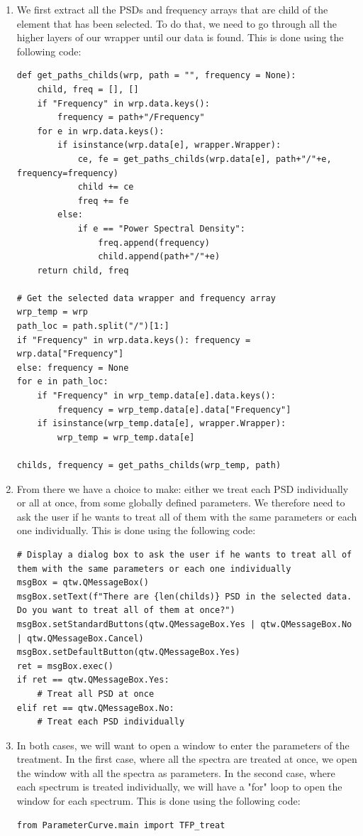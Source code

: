 \documentclass[a4paper,12pt]{article}
\begin{document}
        \begin{enumerate}
            \item We first extract all the PSDs and frequency arrays that are child of the element that has been selected. To do that, we need to go through all the higher layers of our wrapper until our data is found. This is done using the following code:
\begin{lstlisting}
def get_paths_childs(wrp, path = "", frequency = None):
    child, freq = [], []
    if "Frequency" in wrp.data.keys():
        frequency = path+"/Frequency"
    for e in wrp.data.keys():
        if isinstance(wrp.data[e], wrapper.Wrapper):
            ce, fe = get_paths_childs(wrp.data[e], path+"/"+e, frequency=frequency)
            child += ce
            freq += fe
        else:
            if e == "Power Spectral Density":
                freq.append(frequency)
                child.append(path+"/"+e)
    return child, freq
        
# Get the selected data wrapper and frequency array
wrp_temp = wrp
path_loc = path.split("/")[1:]
if "Frequency" in wrp.data.keys(): frequency = wrp.data["Frequency"]
else: frequency = None
for e in path_loc: 
    if "Frequency" in wrp_temp.data[e].data.keys(): 
        frequency = wrp_temp.data[e].data["Frequency"]
    if isinstance(wrp_temp.data[e], wrapper.Wrapper): 
        wrp_temp = wrp_temp.data[e]

childs, frequency = get_paths_childs(wrp_temp, path)
\end{lstlisting}
        \item From there we have a choice to make: either we treat each PSD individually or all at once, from some globally defined parameters. We therefore need to ask the user if he wants to treat all of them with the same parameters or each one individually. This is done using the following code:
\begin{lstlisting}
# Display a dialog box to ask the user if he wants to treat all of them with the same parameters or each one individually
msgBox = qtw.QMessageBox()        
msgBox.setText(f"There are {len(childs)} PSD in the selected data. Do you want to treat all of them at once?")
msgBox.setStandardButtons(qtw.QMessageBox.Yes | qtw.QMessageBox.No | qtw.QMessageBox.Cancel)
msgBox.setDefaultButton(qtw.QMessageBox.Yes)
ret = msgBox.exec()
if ret == qtw.QMessageBox.Yes: 
    # Treat all PSD at once
elif ret == qtw.QMessageBox.No:
    # Treat each PSD individually
\end{lstlisting}
        \item In both cases, we will want to open a window to enter the parameters of the treatment. In the first case, where all the spectra are treated at once, we open the window with all the spectra as parameters. In the second case, where each spectrum is treated individually, we will have a "for" loop to open the window for each spectrum. This is done using the following code:
\begin{lstlisting}
from ParameterCurve.main import TFP_treat


\end{lstlisting}
\end{enumerate}
\end{document}
